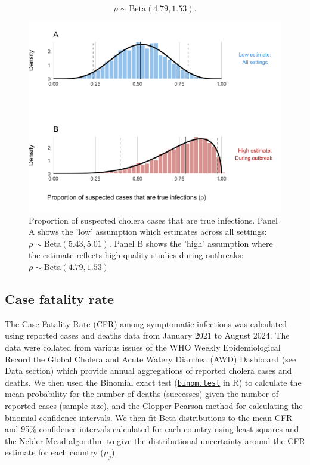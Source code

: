 \documentclass[
]{book}
\begin{document}
\begin{equation}
\rho \sim \text{Beta}(4.79, 1.53).
\end{equation}

\begin{figure}

{\centering \includegraphics[width=1\linewidth]{figures/suspected_cases} 

}

\caption{Proportion of suspected cholera cases that are true infections. Panel A shows the 'low' assumption which estimates across all settings: $\rho \sim \text{Beta}(5.43, 5.01)$. Panel B shows the 'high' assumption where the estimate reflects high-quality studies during outbreaks: $\rho \sim \text{Beta}(4.79, 1.53)$}\label{fig:rho}
\end{figure}

\subsection{Case fatality rate}\label{case-fatality-rate}

The Case Fatality Rate (CFR) among symptomatic infections was calculated using reported cases and deaths data from January 2021 to August 2024. The data were collated from various issues of the WHO Weekly Epidemiological Record the Global Cholera and Acute Watery Diarrhea (AWD) Dashboard (see Data section) which provide annual aggregations of reported cholera cases and deaths. We then used the Binomial exact test (\href{https://www.rdocumentation.org/packages/stats/versions/3.6.2/topics/binom.test}{\texttt{binom.test}} in R) to calculate the mean probability for the number of deaths (successes) given the number of reported cases (sample size), and the \href{https://en.wikipedia.org/wiki/Binomial_proportion_confidence_interval\#Clopper\%E2\%80\%93Pearson_interval}{Clopper-Pearson method} for calculating the binomial confidence intervals. We then fit Beta distributions to the mean CFR and 95\% confidence intervals calculated for each country using least squares and the Nelder-Mead algorithm to give the distributional uncertainty around the CFR estimate for each country (\(\mu_j\)).
\end{document}
